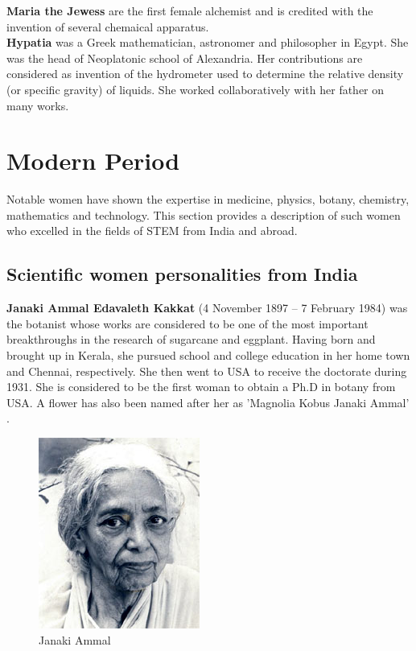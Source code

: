 \documentclass[a4paper,10pt]{article}
\begin{document}
\newblock
\textbf{Maria the Jewess} are the first female alchemist and is credited with the invention of several chemaical apparatus.\\

\newblock
\textbf{Hypatia} was a Greek mathematician, astronomer and philosopher in Egypt. She was the head of Neoplatonic school of Alexandria. Her contributions are considered as invention of the hydrometer used to determine the relative density (or specific gravity) of liquids. She worked collaboratively with her father on many works.\\

\section{Modern Period}
\label{sec:modern}
Notable women have shown the expertise in medicine, physics, botany, chemistry, mathematics and technology. This section provides a description of such women who excelled in the fields of STEM from India and abroad. 

\subsection{Scientific women personalities from India}

\newblock
\textbf{Janaki Ammal Edavaleth Kakkat} (4 November 1897 – 7 February 1984) was the botanist whose works are considered to be one of the most important breakthroughs in the research of sugarcane and eggplant. Having born and brought up in Kerala, she pursued school and college education in her home town and Chennai, respectively. She then went to USA to receive the doctorate during 1931. She is considered to be the first woman to obtain a Ph.D in botany from USA. A flower has also been named after her as 'Magnolia Kobus Janaki Ammal' \cite{janaki}.

\begin{center}
\begin{figure}[h]
\centering
 \includegraphics[scale=0.6]{janaki.jpg}
 \caption{Janaki Ammal}
\end{figure}
\end{center}
\end{document}

